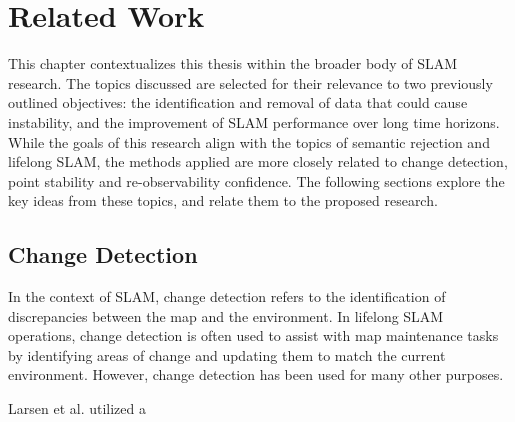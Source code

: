 \section{Related Work}
\label{sec:related_work}

This chapter contextualizes this thesis within the broader body of SLAM research. The topics discussed are selected for their relevance to two previously outlined objectives: the identification and removal of data that could cause instability, and the improvement of SLAM performance over long time horizons. While the goals of this research align with the topics of semantic rejection and lifelong SLAM, the methods applied are more closely related to change detection, point stability and re-observability confidence. The following sections explore the key ideas from these topics, and relate them to the proposed research.

\subsection{Change Detection}

In the context of SLAM, change detection refers to the identification of discrepancies between the map and the environment. In lifelong SLAM operations, change detection is often used to assist with map maintenance tasks by identifying areas of change and updating them to match the current environment. However, change detection has been used for many other purposes.

Larsen et al. \cite{larsenChangeDetectionModel} utilized a 




